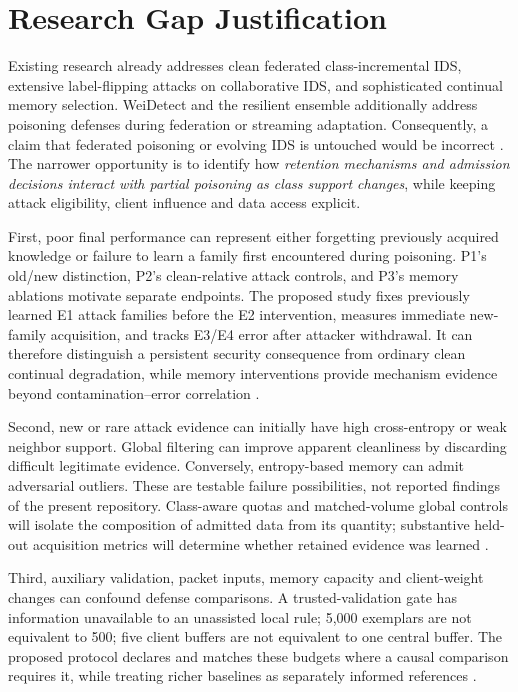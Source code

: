 \documentclass[10pt,a4paper]{article}
\begin{document}
\section{Research Gap Justification}
Existing research already addresses clean federated class-incremental IDS, extensive label-flipping attacks on collaborative IDS, and sophisticated continual memory selection. WeiDetect and the resilient ensemble additionally address poisoning defenses during federation or streaming adaptation. Consequently, a claim that federated poisoning or evolving IDS is untouched would be incorrect \cite{carillo,lavaur,guo,wei,ensemble}. The narrower opportunity is to identify how \emph{retention mechanisms and admission decisions interact with partial poisoning as class support changes}, while keeping attack eligibility, client influence and data access explicit.

First, poor final performance can represent either forgetting previously acquired knowledge or failure to learn a family first encountered during poisoning. P1's old/new distinction, P2's clean-relative attack controls, and P3's memory ablations motivate separate endpoints. The proposed study fixes previously learned E1 attack families before the E2 intervention, measures immediate new-family acquisition, and tracks E3/E4 error after attacker withdrawal. It can therefore distinguish a persistent security consequence from ordinary clean continual degradation, while memory interventions provide mechanism evidence beyond contamination--error correlation \cite{carillo,lavaur,guo}.

Second, new or rare attack evidence can initially have high cross-entropy or weak neighbor support. Global filtering can improve apparent cleanliness by discarding difficult legitimate evidence. Conversely, entropy-based memory can admit adversarial outliers. These are testable failure possibilities, not reported findings of the present repository. Class-aware quotas and matched-volume global controls will isolate the composition of admitted data from its quantity; substantive held-out acquisition metrics will determine whether retained evidence was learned \cite{guo,carillo,repo}.

Third, auxiliary validation, packet inputs, memory capacity and client-weight changes can confound defense comparisons. A trusted-validation gate has information unavailable to an unassisted local rule; 5,000 exemplars are not equivalent to 500; five client buffers are not equivalent to one central buffer. The proposed protocol declares and matches these budgets where a causal comparison requires it, while treating richer baselines as separately informed references \cite{wei,guo,cerasuolo,repo}.
\end{document}
